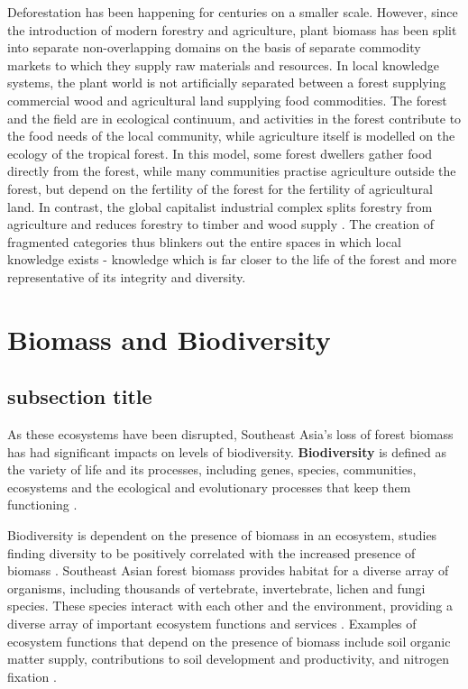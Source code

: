Deforestation has been happening for centuries on a smaller scale. However, since the introduction of modern forestry and agriculture, plant biomass has been split into separate non-overlapping domains on the basis of separate commodity markets to which they supply raw materials and resources. In local knowledge systems, the plant world is not artificially separated between a forest supplying commercial wood and agricultural land supplying food commodities. The forest and the field are in ecological continuum, and activities in the forest contribute to the food needs of the local community, while agriculture itself is modelled on the ecology of the tropical forest. In this model, some forest dwellers gather food directly from the forest, while many communities practise agriculture outside the forest, but depend on the fertility of the forest for the fertility of agricultural land. In contrast, the global capitalist industrial complex splits forestry from agriculture and reduces forestry to timber and wood supply \citep{de1989economic}. The creation of fragmented categories thus blinkers out the entire spaces in which local knowledge exists - knowledge which is far closer to the life of the forest and more representative of its integrity and diversity.



 

\section{Biomass and Biodiversity}  

\subsection{subsection title}

 As these ecosystems have been disrupted, Southeast Asia's loss of forest biomass has had significant impacts on levels of biodiversity. \textbf{Biodiversity} is defined as the variety of life and its processes, including genes, species, communities, ecosystems and the ecological and evolutionary processes that keep them functioning \citep{noss1994saving}. 
 
 Biodiversity is dependent on the presence of biomass in an ecosystem, studies finding diversity to be positively correlated with the increased presence of biomass \citep{cardinale2007impacts}. Southeast Asian forest biomass provides habitat for a diverse array of organisms, including thousands of vertebrate, invertebrate, lichen and fungi species. These species interact with each other and the environment, providing a diverse array of important ecosystem functions and services . Examples of ecosystem functions that depend on the presence of biomass include soil organic matter supply, contributions to soil development and productivity, and nitrogen fixation \citep{humphrey1999relationships}.
 
